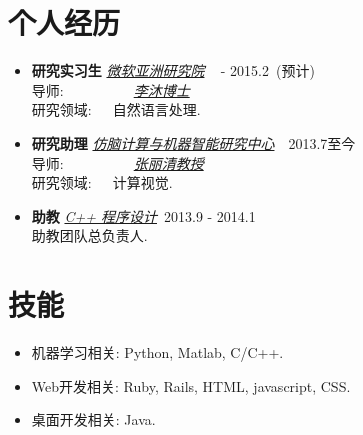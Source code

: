\documentclass[letterpaper]{article}
\begin{document}
\section*{个人经历}
\begin{itemize}
\item \textbf{研究实习生} \emph{\href{http://research.microsoft.com/en-us/labs/asia/}{微软亚洲研究院}} ~\qquad\qquad\qquad{} - 2015.2~(预计)\\
    导师:~~~~~~~~~~\emph{\href{http://bcmi.sjtu.edu.cn/~zhangliqing/}{李沐博士}}\\
    研究领域:~~~自然语言处理.
\item \textbf{研究助理} \emph{\href{http://bcmi.sjtu.edu.cn}{仿脑计算与机器智能研究中心}}\qquad\quad~~2013.7至今\\
    导师:~~~~~~~~~~\emph{\href{http://bcmi.sjtu.edu.cn/~zhangliqing/}{张丽清教授}}\\
    研究领域:~~~计算视觉.
\item \textbf{助教}  \emph{\href{http://acm.sjtu.edu.cn/wiki/Programming_2013}{C++ 程序设计}}\quad\qquad\qquad\qquad\qquad\quad\qquad~2013.9 - 2014.1\\
助教团队总负责人.
\end{itemize}
\section*{技能}
\begin{itemize}
\item 机器学习相关: Python, Matlab, C/C++.
\item Web开发相关: Ruby, Rails, HTML, javascript, CSS.
\item 桌面开发相关: Java.
\end{itemize}
\end{document}
